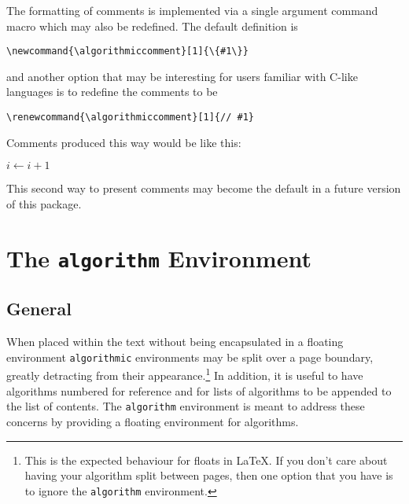 \documentclass[letterpaper]{article}
\newcommand{\keyword}[1]{\texttt{#1}}
\begin{document}
The formatting of comments is implemented via a single argument command
macro which may also be redefined.  The default definition is
\begin{verbatim}
\newcommand{\algorithmiccomment}[1]{\{#1\}}
\end{verbatim}
and another option that may be interesting for users familiar with
C-like languages is to redefine the comments to be
\begin{verbatim}
\renewcommand{\algorithmiccomment}[1]{// #1}
\end{verbatim}
Comments produced this way would be like this:
\renewcommand{\algorithmiccomment}[1]{// #1}
\begin{algorithmic}
  \STATE $i \leftarrow i +1$ 
\end{algorithmic}
This second way to present comments may become the default in a future
version of this package.

\section[Environment: \keyword{algorithm}]%
{The \keyword{algorithm} Environment}

\subsection{General}

When placed within the text without being encapsulated in a floating
environment \texttt{algorithmic} environments may be split over a page
boundary, greatly detracting from their appearance.\footnote{This is the
  expected behaviour for floats in \LaTeX. If you don't care about
  having your algorithm split between pages, then one option that you
  have is to ignore the \texttt{algorithm} environment.} In addition, it
is useful to have algorithms numbered for reference and for lists of
algorithms to be appended to the list of contents.  The
\texttt{algorithm} environment is meant to address these concerns by
providing a floating environment for algorithms.
\end{document}

